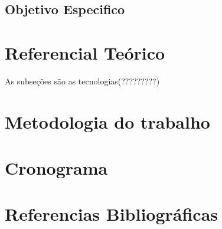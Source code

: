 \documentclass[a4paper, 12pt]{article}
\begin{document}
\subsection{Objetivo Especifico}

\section{Referencial Teórico}
As subseções são as tecnologias(?????????)

\section{Metodologia do trabalho}

\section{Cronograma}

\section{Referencias Bibliográficas}
\end{document}

